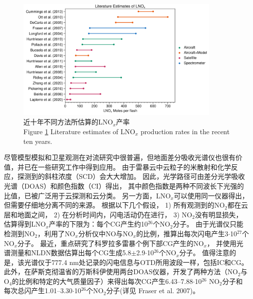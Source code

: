 \begin{figure}[htbp]
\centering
\includegraphics[width=0.9\textwidth]{./figures/lnox_production_xin.png}
\caption{近十年不同方法所估算的LNO$_x$产率\\
Figure \ref{figure:lnox_production_xin} Literature estimates of LNO$_x$ production rates in the recent ten years.}
\label{figure:lnox_production_xin}
\end{figure}

尽管模型模拟和卫星观测在对流研究中很普遍，但地面差分吸收光谱仪也很有价值，并已在一些研究工作中得到应用。
由于雷暴云中云粒子的米散射和化学反应，探测到的斜柱浓度（SCD）会大大增加\citep{Erle.1995,Pfeilsticker.1998,Winterrath.1999}。
因此，光学路径可由差分光学吸收光谱（DOAS）\citep{Veitel.1998,Wagner.1998}和颜色指数（CI）得出，
其中颜色指数是两种不同波长下光强的比值，已被广泛用于云探测和云分类\citep{Wagner.2014,Wang.2015,Wagner.2016}。
另一方面，LNO$_x$可以使用同一仪器得出，但需要仔细地分离不同的来源。
\citet{Noxon.1976}根据以下几个假设，
1) 所有观测到的NO$_2$都在云层和地面之间，
2) 在分析时间内，闪电活动仍在进行，
3) NO$_2$没有明显损失，估算得到LNO$_x$产率的下限为：每个CG产生约10$^{26}$个NO$_2$分子。
由于光谱仪只能检测到NO$_2$，\citet{Franzblau.1989}利用了NO$_x$分析仪中NO与NO$_x$的比例，推算出每次闪电产生3$\cdot$10$^{27}$个NO$_x$分子。
最近，\citet{Langford.2004}重点研究了科罗拉多雷暴个例下部CG产生的NO$_x$，
并使用光谱测量和NLDN数据估算出每个CG生成5.8$\pm$2.9$\cdot$10$^{26}$个NO$_x$分子。
值得注意的是，该光谱仪于777.4 nm处记录的闪电信息与OTD所用波段一样，包括IC和CG。
此外，在萨斯克彻温省的万斯科伊使用两台DOAS仪器，开发了两种方法（NO$_2$与O$_4$的比例和特定的大气质量因子）来得出每次CG产生6.43--7.88$\cdot$10$^{26}$ NO$_2$分子和每次总闪产生1.01--3.30$\cdot$10$^{26}$个NO$_2$分子(详见 Fraser et al. 2007)。

